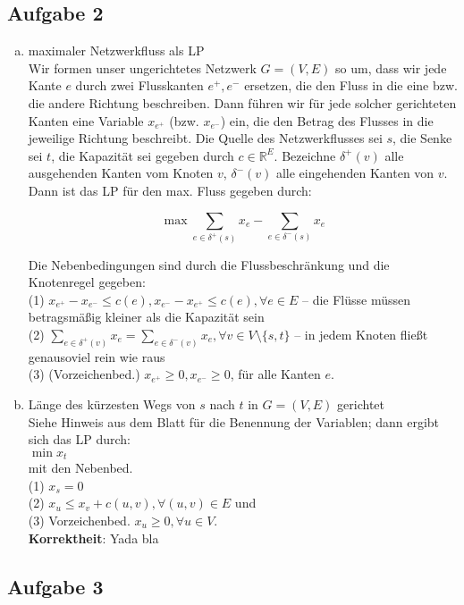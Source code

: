 \documentclass[11pt,a4paper,ngerman]{article}
\begin{document}
\subsection*{Aufgabe 2}
\begin{enumerate}[a)]
\item maximaler Netzwerkfluss als LP \\
Wir formen unser ungerichtetes Netzwerk $G = (V,E)$ so um, dass wir jede Kante $e$ durch zwei Flusskanten $e^+, e^-$
ersetzen, die den Fluss in die eine bzw. die andere Richtung beschreiben. Dann führen wir für jede solcher
gerichteten Kanten eine Variable $x_{e^+}$ (bzw. $x_{e^-}$) ein, die den Betrag des Flusses in die jeweilige 
Richtung beschreibt. Die Quelle des Netzwerkflusses sei $s$, die Senke sei $t$, die Kapazität sei gegeben durch $c \in \mathbb{R}^{E}$. Bezeichne $\delta^+(v)$ alle ausgehenden Kanten vom Knoten $v$, $\delta^-(v)$ alle eingehenden Kanten von $v$. Dann ist das LP für den max. Fluss gegeben durch:

$$ \max \sum_{e \in \delta^+(s)} x_e - \sum_{e \in \delta^-(s)} x_e$$

Die Nebenbedingungen sind durch die Flussbeschränkung und die Knotenregel gegeben: \\
(1) $x_{e^+} - x_{e^-} \leq c(e), x_{e^-} - x_{e^+} \leq c(e), \forall e \in E$ -- die Flüsse müssen betragsmäßig kleiner als die Kapazität sein \\

(2) $\sum_{e \in \delta^+(v)} x_e = \sum_{e \in \delta^-(v)} x_e, \forall v \in V \setminus \{s,t\}$ -- in jedem Knoten fließt genausoviel rein wie raus \\

(3) (Vorzeichenbed.) $x_{e^+} \geq 0, x_{e^-} \geq 0$, für alle Kanten $e$.

\item Länge des kürzesten Wegs von $s$ nach $t$ in $G = (V,E)$ gerichtet \\
Siehe Hinweis aus dem Blatt für die Benennung der Variablen; dann ergibt sich das LP durch: \\
$ \min x_t $ \\
mit den Nebenbed. \\
(1) $x_s = 0$ \\
(2) $x_u \leq x_v + c(u,v), \forall (u,v) \in E$ und \\
(3) Vorzeichenbed. $x_u \geq 0, \forall u \in V$. \\

\textbf{Korrektheit}: Yada bla
\end{enumerate}
\subsection*{Aufgabe 3}




\label{LastPage}
\end{document}
